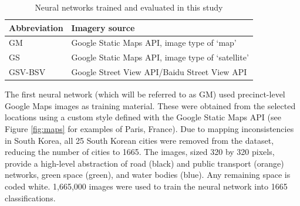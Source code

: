 \documentclass[sageh,times]{sagej}
\begin{document}
\begin{table}[!htbp]
\caption{Neural networks trained and evaluated in this study \label{tab:neuralnetworks}}     
\begin{tabular}{ l l }
 \hline Abbreviation   &  Imagery source \\ \hline
GM & Google Static Maps API, image type of `map'     \\ 
GS & Google Static Maps API, image type of `satellite'      \\
GSV-BSV & Google Street View API/Baidu Street View API     \\ \hline

\end{tabular}
\end{table}

The first neural network (which will be referred to as GM) used precinct-level Google Maps images as training material. These were obtained from the selected locations using a custom style defined with the Google Static Maps API \citep{GoogleStatic2017} (see Figure \ref{fig:maps} for examples of Paris, France). Due to mapping inconsistencies in South Korea, all 25 South Korean cities were removed from the dataset, reducing the number of cities to 1665. The images, sized 320 by 320 pixels, provide a high-level abstraction of road (black) and public transport (orange) networks, green space (green), and water bodies (blue). Any remaining space is coded white. 1,665,000 images were used to train the neural network into 1665 classifications.
\end{document}
